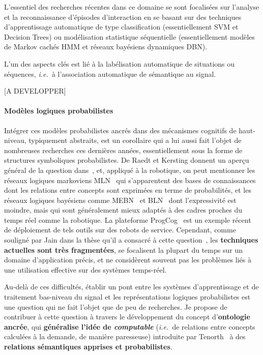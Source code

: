 \documentclass[a4paper]{article}
\newcommand{\ie}{{\textit{i.e.~}}}
\begin{document}
L'essentiel des recherches récentes dans ce domaine se sont focalisées sur
l'analyse et la reconnaissance d'épisodes d'interaction en se basant sur des
techniques d'apprentissage automatique de type classification (essentiellement SVM
et Decision Trees) ou modélisation statistique séquentielle (essentiellement
modèles de Markov cachés HMM et réseaux bayésiens dynamiques DBN).

L'un des aspects clés est lié à la labélisation automatique
de situations ou séquences, \ie à l'association automatique de sémantique au
signal. ~\cite{mihoub2014modeling}

[A DEVELOPPER]

\paragraph{Modèles logiques probabilistes}

Intégrer ces modèles probabilistes ancrés dans des mécanismes cognitifs de
haut-niveau, typiquement abstraits, est un corollaire qui a lui aussi fait
l'objet de nombreuses recherches ces dernières années, essentiellement sous la
forme de structures symboliques probabilistes. De Raedt et Kersting donnent un
aperçu général de la question dans~\cite{deraedt2008probabilistic}, et, appliqué
à la robotique, on peut mentionner les réseaux logiques markoviens
MLN~\cite{richardson2006markov} qui s'apparentent des bases de connaissances
dont les relations entre concepts sont exprimées en terme de probabilités, et
les réseaux logiques bayésiens comme MEBN~\cite{laskey2008mebn} et
BLN~\cite{jain2009bayesian} dont l'expressivité est moindre, mais qui sont
généralement mieux adaptés à des cadres proches du temps réel comme la
robotique. La plateforme {\sc ProgCog}~\cite{jain2009equipping} est un exemple
récent de déploiement de tels outils sur des robots de service. Cependant, comme
souligné par Jain dans la thèse qu'il a consacré à cette
question~\cite{jain2012probabilistic}, les \textbf{techniques actuelles sont
très fragmentées}, se focalisent la plupart du temps sur un domaine
d'application précis, et ne considèrent souvent pas les problèmes liés à une
utilisation effective sur des systèmes temps-réel.


Au-delà de ces difficultés, établir un pont entre les systèmes d'apprentissage
et de traitement bas-niveau du signal et les représentations logiques
probabilistes est une question qui ne fait l'objet que de peu de recherches. Je
propose de contribuer à cette question à travers le développement du concept
d'\textbf{ontologie ancrée}, qui \textbf{généralise l'idée de \emph{computable}}
(\ie de relations entre concepts calculées à la demande, de manière
paresseuse) introduite par Tenorth~\cite{tenorth2009knowrob} à des
\textbf{relations sémantiques apprises et probabilistes}.
\end{document}
